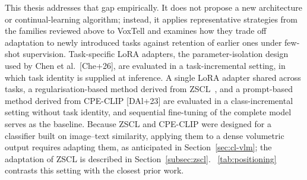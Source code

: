 This thesis addresses that gap empirically. It does not propose a new architecture or continual-learning algorithm; instead, it applies representative strategies from the families reviewed above to VoxTell and examines how they trade off adaptation to newly introduced tasks against retention of earlier ones under few-shot supervision.
Task-specific LoRA adapters, the parameter-isolation design used by Chen et al.\ [Che+26], are evaluated in a task-incremental setting, in which task identity is supplied at inference. A single LoRA adapter shared across tasks, a regularisation-based method derived from ZSCL~\cite{zheng2023preventingzeroshottransferdegradation}, and a prompt-based method derived from CPE-CLIP [DAl+23] are evaluated in a class-incremental setting without task identity, and sequential fine-tuning of the complete model serves as the baseline. Because ZSCL and CPE-CLIP were designed for a classifier built on image--text similarity, applying them to a dense volumetric output requires adapting them, as anticipated in Section~\ref{sec:cl-vlm}; the adaptation of ZSCL is described in Section~\ref{subsec:zscl}.
\tablename~\ref{tab:positioning} contrasts this setting with the closest prior work.

